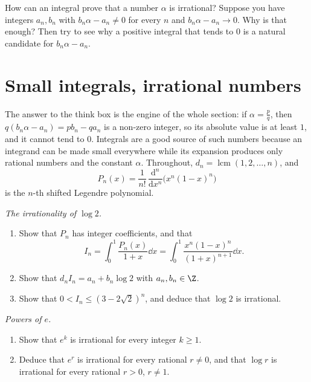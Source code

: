 \begin{think}
How can an integral prove that a number $\alpha$ is irrational? Suppose you have integers $a_n,b_n$ with $b_n\alpha-a_n\ne0$ for every
$n$ and $b_n\alpha-a_n\to0$. Why is that enough? Then try to see why a positive integral that tends to $0$ is a natural candidate for
$b_n\alpha-a_n$.
\end{think}

\section{Small integrals, irrational numbers}

The answer to the think box is the engine of the whole section: if $\alpha=\frac pq$, then $q(b_n\alpha-a_n)=pb_n-qa_n$ is a non-zero
integer, so its absolute value is at least $1$, and it cannot tend to $0$. Integrals are a good source of such numbers because an
integrand can be made small everywhere while its expansion produces only rational numbers and the constant $\alpha$. Throughout,
$d_n=\operatorname{lcm}(1,2,\dots,n)$, and
\[
P_n(x)=\frac1{n!}\,\frac{\mathrm d^n}{\mathrm dx^n}\bigl(x^n(1-x)^n\bigr)
\]
is the $n$-th shifted Legendre polynomial.

\begin{exercise}[$\star\star$]\label{pb:logtwo}
\emph{The irrationality of $\log2$.}
\begin{enumerate}[label=(\alph*)]
\item Show that $P_n$ has integer coefficients, and that
\[
I_n=\int_0^1\frac{P_n(x)}{1+x}\dd x=\int_0^1\frac{x^n(1-x)^n}{(1+x)^{n+1}}\dd x.
\]
\item Show that $d_nI_n=a_n+b_n\log2$ with $a_n,b_n\in\Z$.
\item Show that $0<I_n\le(3-2\sqrt2)^n$, and deduce that $\log2$ is irrational.
\end{enumerate}
\end{exercise}

\begin{exercise}[$\star\star$]\label{pb:hermite}
\emph{Powers of $e$.}
\begin{enumerate}[label=(\alph*)]
\item Show that $e^k$ is irrational for every integer $k\ge1$.
\item Deduce that $e^r$ is irrational for every rational $r\ne0$, and that $\log r$ is irrational for every rational $r>0$, $r\ne1$.
\end{enumerate}
\end{exercise}

